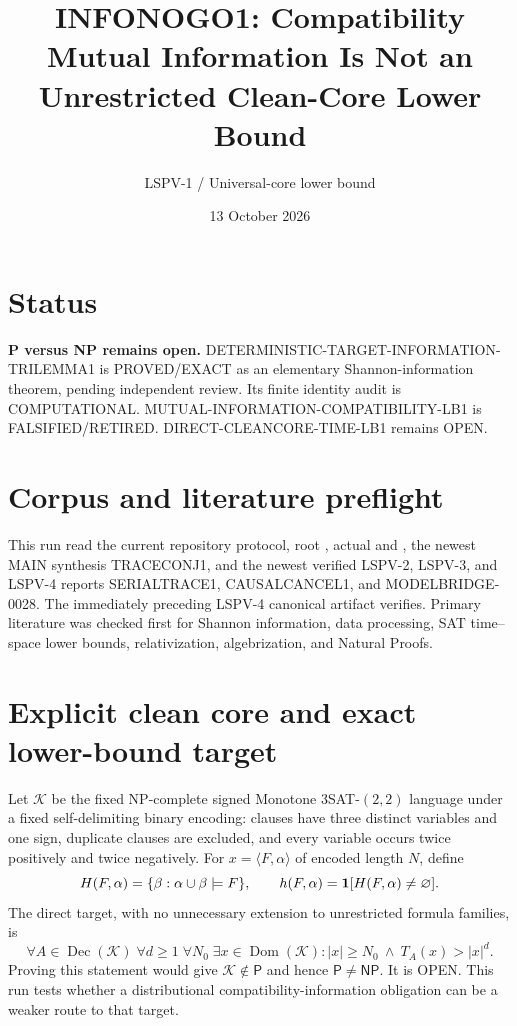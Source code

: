 \documentclass[11pt]{article}
\title{INFONOGO1: Compatibility Mutual Information Is Not an Unrestricted Clean-Core Lower Bound}
\author{LSPV-1 / Universal-core lower bound}
\date{13 October 2026}
\newcommand{\OPEN}{\textsf{OPEN}}
\newcommand{\EXACT}{\textsf{PROVED/EXACT}}
\newcommand{\COMP}{\textsf{COMPUTATIONAL}}
\newcommand{\RET}{\textsf{FALSIFIED/RETIRED}}
\begin{document}
\sloppy
\maketitle

\section*{Status}
\textbf{P versus NP remains open.}
\textsf{DETERMINISTIC-TARGET-INFORMATION-TRILEMMA1} is \EXACT{} as an
elementary Shannon-information theorem, pending independent review.  Its
finite identity audit is \COMP{}.
\textsf{MUTUAL-INFORMATION-COMPATIBILITY-LB1} is \RET{}.
\textsf{DIRECT-CLEANCORE-TIME-LB1} remains \OPEN{}.

\section*{Corpus and literature preflight}
This run read the current repository protocol, root , actual
 and , the newest MAIN synthesis
\textsf{TRACECONJ1}, and the newest verified LSPV-2, LSPV-3, and LSPV-4
reports \textsf{SERIALTRACE1}, \textsf{CAUSALCANCEL1}, and
\textsf{MODELBRIDGE-0028}.  The immediately preceding LSPV-4 canonical
artifact verifies.  Primary literature was checked first for Shannon
information, data processing, SAT time--space lower bounds, relativization,
algebrization, and Natural Proofs.

\section*{Explicit clean core and exact lower-bound target}
Let $\mathcal K$ be the fixed NP-complete signed Monotone
$3$SAT-$(2,2)$ language under a fixed self-delimiting binary encoding:
clauses have three distinct variables and one sign, duplicate clauses are
excluded, and every variable occurs twice positively and twice negatively.
For $x=\langle F,\alpha\rangle$ of encoded length $N$, define
\[
 H(F,\alpha)=\{\beta:\alpha\cup\beta\models F\},\qquad
 h(F,\alpha)={\bf 1}[H(F,\alpha)\ne\varnothing].
\]
The direct target, with no unnecessary extension to unrestricted formula
families, is
\[
 \forall A\in\operatorname{Dec}(\mathcal K)\;
 \forall d\ge1\;\forall N_0\;\exists x\in\operatorname{Dom}(\mathcal K):
 |x|\ge N_0\ \land\ T_A(x)>|x|^d.
\]
Proving this statement would give $\mathcal K\notin\mathsf P$ and hence
$\mathsf P\ne\mathsf{NP}$.  It is \OPEN{}.  This run tests whether a
distributional compatibility-information obligation can be a weaker route to
that target.
\end{document}
